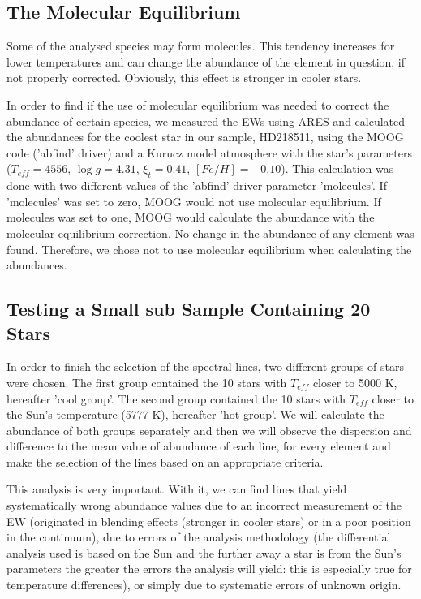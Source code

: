 \documentclass[dvips,12pt,a4paper]{report}
\begin{document}
{\subsection {The Molecular Equilibrium}

Some of the analysed species may form molecules. This tendency increases for lower temperatures and can change the abundance of the element in question, if not properly corrected. Obviously, this effect is stronger in cooler stars.

In order to find if the use of molecular equilibrium was needed to correct the abundance of certain species, we measured the EWs using ARES and calculated the abundances for the coolest star in our sample, HD218511, using the MOOG code ('abfind' driver) and a Kurucz model atmosphere with the star's parameters ($T_{eff}=4556$, $\log g=4.31$, $\xi_t=0.41$, $[Fe/H]=-0.10$).  This calculation was done with two different values of the 'abfind' driver parameter 'molecules'. If 'molecules' was set to zero, MOOG would not use molecular equilibrium. If molecules was set to one, MOOG would calculate the abundance with the molecular equilibrium correction. No change in the abundance of any element was found. Therefore, we chose not to use molecular equilibrium when calculating the abundances.

\subsection {Testing a Small sub Sample Containing 20 Stars} 
\label{20stars}
In order to finish the selection of the spectral lines, two different groups of stars were chosen. The first group contained the 10 stars with $T_{eff}$ closer to 5000 K, hereafter 'cool group'. The second group contained the 10 stars with $T_{eff}$ closer to the Sun's temperature (5777 K), hereafter 'hot group'. We will calculate the abundance of both groups separately and then we will observe the dispersion and difference to the mean value of abundance of each line, for every element and make the selection of the lines based on an appropriate criteria. %

This analysis is very important. With it, we can find lines that yield systematically wrong abundance values due to an incorrect measurement of the EW (originated in blending effects (stronger in cooler stars) or in a poor position in the continuum), due to errors of the analysis methodology (the differential analysis used is based on the Sun and the further away a star is from the Sun's parameters the greater the errors the analysis will yield: this is especially true for temperature differences), or simply due to systematic errors of unknown origin.

}
\end{document}
